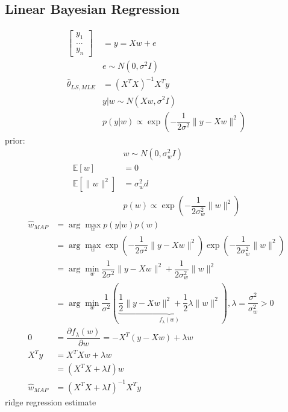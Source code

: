 \documentclass{article}
\begin{document}
\subsection{Linear Bayesian Regression}
\begin{align*}
\begin{bmatrix} y_{1} \\ ... \\ y_{n} \end{bmatrix} &= y = X w + e 
\\ &  e  \sim  N\left(0, \sigma^{2} I \right)
\\ \hat{\theta}_{LS, MLE} &= \left(X^{T} X\right)^{-1} X^{T} y 
\\ &  y  | w \sim  N\left(X w, \sigma^{2} I \right)
\\ &  p\left(y | w\right)  \propto \exp\left(- \dfrac{1}{2 \sigma^{2}} \| y - X w \|^{2}\right)
\end{align*}
prior:
\begin{align*}
&  w  \sim  N\left(0, \sigma^{2}_{w} I \right)
\\ \mathbb{E}\left[w\right] &= 0
\\ \mathbb{E}\left[\| w \|^{2}\right] &= \sigma_{w}^{2} d 
\\ &  p\left(w\right)  \propto \exp\left(- \dfrac{1}{2 \sigma_{w}^{2}} \| w \|^{2}\right)
\end{align*}
\begin{align*}
\hat{w}_{MAP} &= \arg\displaystyle\max_{w} p\left(y | w\right) p\left(w \right)
\\ &= \arg\displaystyle\max_{w} \exp\left(- \dfrac{1}{2 \sigma^{2}} \| y - X w \|^{2}\right) \exp\left(- \dfrac{1}{2 \sigma_{w}^{2}} \| w \|^{2}\right)
\\ &= \arg\displaystyle\min_{w} \dfrac{1}{2 \sigma^{2}} \| y - X w \|^{2} + \dfrac{1}{2 \sigma_{w}^{2}} \| w \|^{2}
\\ &= \arg\displaystyle\min_{w} \dfrac{1}{\sigma^{2}} \left(\underbrace{\dfrac{1}{2} \| y - X w \|^{2} + \dfrac{1}{2} \lambda \| w \|^{2}}_{f_{\lambda} \left(w\right)}\right), \lambda = \dfrac{\sigma^{2}}{\sigma_{w}^{2}} > 0
\\ 0 &= \dfrac{\partial f_{\lambda} \left(w\right)}{\partial w} = - X^{T} \left(y - X w\right) + \lambda w 
\\ X^{T} y &= X^{T} X w + \lambda w 
\\ &= \left(X^{T} X + \lambda I\right) w 
\\ \hat{w}_{MAP} &= \left(X^{T} X + \lambda I\right)^{-1} X^{T} y 
\end{align*}
ridge regression estimate
\end{document}
